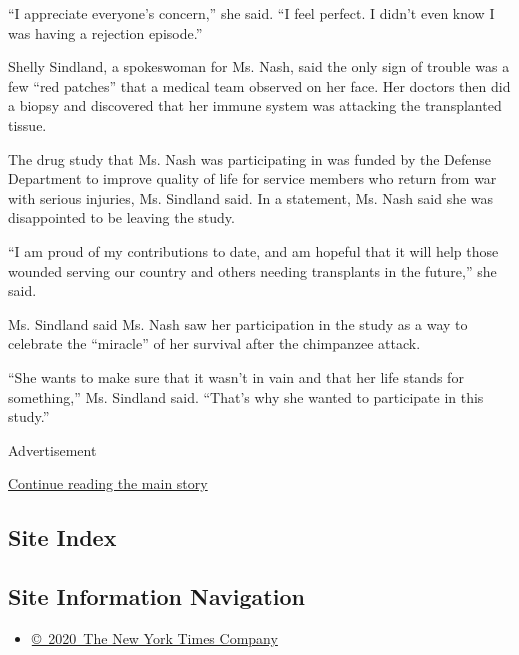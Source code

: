 ``I appreciate everyone's concern,'' she said. ``I feel perfect. I
didn't even know I was having a rejection episode.''

Shelly Sindland, a spokeswoman for Ms. Nash, said the only sign of
trouble was a few ``red patches'' that a medical team observed on her
face. Her doctors then did a biopsy and discovered that her immune
system was attacking the transplanted tissue.

The drug study that Ms. Nash was participating in was funded by the
Defense Department to improve quality of life for service members who
return from war with serious injuries, Ms. Sindland said. In a
statement, Ms. Nash said she was disappointed to be leaving the study.

``I am proud of my contributions to date, and am hopeful that it will
help those wounded serving our country and others needing transplants in
the future,'' she said.

Ms. Sindland said Ms. Nash saw her participation in the study as a way
to celebrate the ``miracle'' of her survival after the chimpanzee
attack.

``She wants to make sure that it wasn't in vain and that her life stands
for something,'' Ms. Sindland said. ``That's why she wanted to
participate in this study.''

Advertisement

\protect\hyperlink{after-bottom}{Continue reading the main story}

\hypertarget{site-index}{%
\subsection{Site Index}\label{site-index}}

\hypertarget{site-information-navigation}{%
\subsection{Site Information
Navigation}\label{site-information-navigation}}

\begin{itemize}
\tightlist
\item
  \href{https://help.nytimes.com/hc/en-us/articles/115014792127-Copyright-notice}{©~2020~The
  New York Times Company}
\end{itemize}

